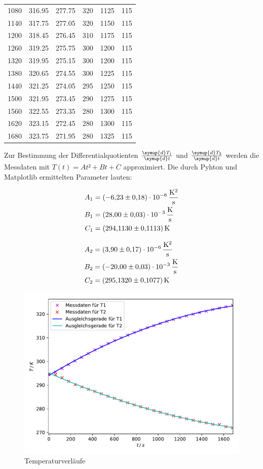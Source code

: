 \begin{table}
\begin{tabular}{c c c c c c}
1080 & 316.95 & 277.75 & 320 & 1125 & 115\\
1140 & 317.75 & 277.05 & 320 & 1150 & 115\\
1200 & 318.45 & 276.45 & 310 & 1175 & 115\\
1260 & 319.25 & 275.75 & 300 & 1200 & 115\\
1320 & 319.95 & 275.15 & 300 & 1200 & 115\\
1380 & 320.65 & 274.55 & 300 & 1225 & 115\\
1440 & 321.25 & 274.05 & 295 & 1250 & 115\\
1500 & 321.95 & 273.45 & 290 & 1275 & 115\\
1560 & 322.55 & 273.35 & 280 & 1300 & 115\\
1620 & 323.15 & 272.45 & 280 & 1300 & 115\\
1680 & 323.75 & 271.95 & 280 & 1325 & 115\\
\bottomrule
\end{tabular}
\end{table}

Zur Bestimmung der Differentialquotienten $\frac{\symup{d}T_1}{\symup{d}t}$ und 
$\frac{\symup{d}T_2}{\symup{d}t}$ werden die Messdaten mit $T(t)=At²+Bt+C$ 
approximiert. Die durch Pyhton und Matplotlib ermittelten Parameter lauten: 

\begin{align*}
A_1 &= \SI{-6.23+-0.18e-6}{\kelvin\per\squared\second}\\
B_1 &= \SI{28+-0.03e-3}{\kelvin\per\second}\\
C_1 &= \SI{294.113+-0.1113}{\kelvin}
\end{align*}

\begin{align*}
A_2 &= \SI{3.90+-0.17e-6}{\kelvin\per\squared\second}\\
B_2 &= \SI{-20+-0.03e-3}{\kelvin\per\second}\\
C_2 &= \SI{295.132+-0.1077}{\kelvin}
\end{align*}

\begin{figure}
  \centering
  \includegraphics[scale=0.8]{content/plot1.pdf}
  \caption{Temperaturverläufe}
  \label{fig:plot}
\end{figure}

